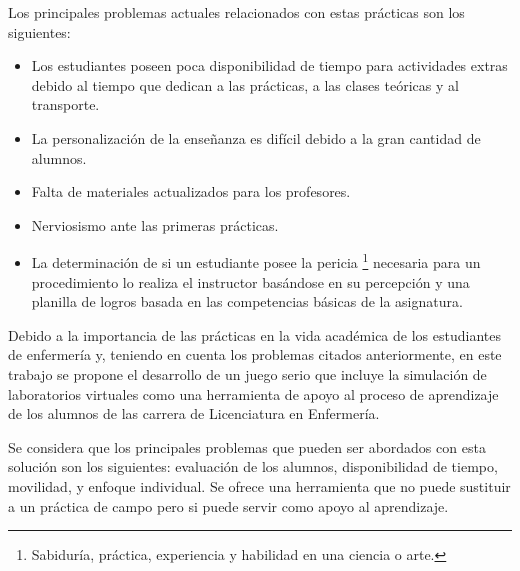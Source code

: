 Los principales problemas actuales relacionados con estas prácticas son los 
siguientes:

\begin{itemize}
\item Los estudiantes poseen poca disponibilidad de tiempo para actividades
    extras debido al tiempo que dedican a las prácticas, a las clases teóricas y
    al transporte\cite{iab:tesis_alumnos}.
\item La personalización de la enseñanza es difícil debido a la gran cantidad de
    alumnos\cite{iab:tesis_alumnos}.
\item Falta de materiales actualizados para los
    profesores\cite{iab:tesis_alumnos}.
\item Nerviosismo ante las primeras prácticas.
\item La determinación de si un estudiante posee la pericia \footnote{Sabiduría,
        práctica, experiencia y habilidad en una ciencia o arte.} necesaria para
    un procedimiento lo realiza el instructor basándose en su percepción y una
    planilla de logros basada en las competencias básicas de la asignatura.
\end{itemize}

Debido a la importancia de las prácticas en la vida académica de los estudiantes
de enfermería y, teniendo en cuenta los problemas citados anteriormente, en este
trabajo se propone el desarrollo de un juego serio que incluye la simulación de
laboratorios virtuales como una herramienta de apoyo al proceso de aprendizaje
de los alumnos de las carrera de Licenciatura en Enfermería. 

Se considera que los principales problemas que pueden ser abordados con esta
solución son los siguientes: evaluación de los alumnos, disponibilidad de
tiempo, movilidad, y enfoque individual. Se ofrece una herramienta que no puede
sustituir a un práctica de campo pero si puede servir como apoyo al aprendizaje.


